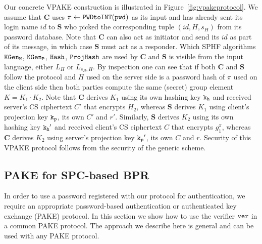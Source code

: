 Our concrete VPAKE construction is illustrated in Figure~\ref{fig:vpakeprotocol}. 
We assume that $\bm{C}$ uses $\pi\gets\texttt{PWDtoINT}(\mathtt{pwd})$ as its input and has already sent its login name $id$ to $\bm{S}$ who picked the corresponding tuple $(id,H,s_H)$ from its password database. 
Note that $\bm{C}$ can also act as initiator and send its $id$ as part of its message, in which case $\bm{S}$ must act as a responder. 
Which SPHF algorithms $\mathtt{KGen_H}$, $\mathtt{KGen_P}$, $\mathtt{Hash}$, $\mathtt{ProjHash}$ are used by $\bm{C}$ and $\bm{S}$ is visible from the input language, either $L_H$ or $L_{s_H,H}$. 
By inspection one can see that if both $\bm{C}$ and $\bm{S}$ follow the protocol and $H$ used on the server side is a password hash of $\pi$ used on the client side then both parties compute the same (secret) group element $K=K_1\cdot K_2$. 
Note that $\bm{C}$ derives $K_1$ using its own hashing key $\mathtt{k_h}$ and received server's CS ciphertext $C'$ that encrypts $H_2$, whereas $\bm{S}$ derives $K_1$ using client's projection key $\mathtt{k_p}$, its own $C'$ and $r'$. 
Similarly, $\bm{S}$ derives $K_2$ using its own hashing key $\mathtt{k_h}'$ and received client's CS ciphertext $C$ that encrypts $g_1^\pi$, whereas $\bm{C}$ derives $K_2$ using server's projection key $\mathtt{k_p}'$, its own $C$ and $r$. Security of this VPAKE protocol follows from the security of the generic scheme.

\subsection{PAKE for SPC-based BPR}
In order to use a password registered with our protocol for authentication, we require an appropriate password-based authentication or authenticated key exchange (PAKE) protocol.
In this section we show how to use the verifier $\mathtt{ver}$ in a common PAKE protocol. The approach we describe here is general and can be used with any PAKE protocol.

